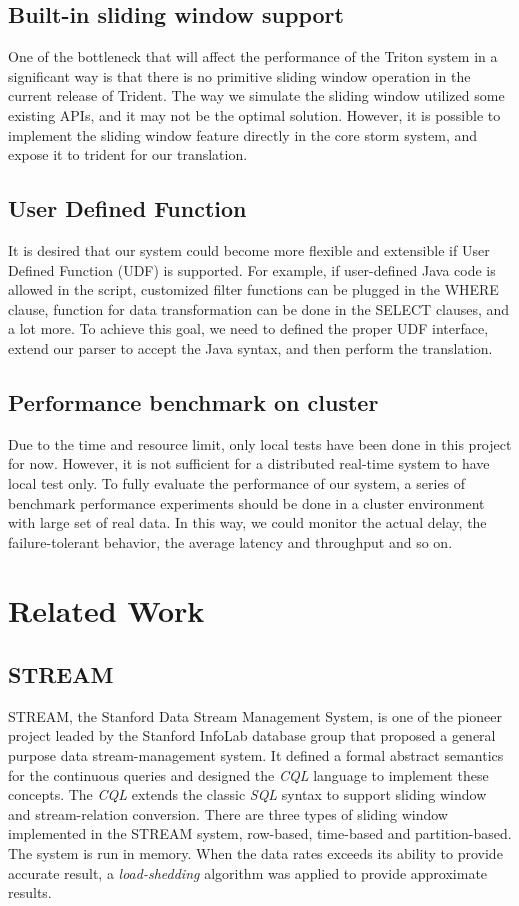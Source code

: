 \documentclass[conference, twocolumn, 11pt]{IEEEtran}
\theoremstyle{definition}
\begin{document}
\subsection{Built-in sliding window support}
One of the bottleneck that will affect the performance of the Triton system in a significant way is that there is no primitive sliding window operation in the current release of Trident.
The way we simulate the sliding window utilized some existing APIs, and it may not be the optimal solution. However, it is possible to implement the sliding window feature directly in
the core storm system, and expose it to trident for our translation.

\subsection{User Defined Function}
It is desired that our system could become more flexible and extensible if User Defined Function (UDF) is supported. For example, if user-defined Java code is allowed in the script,
customized filter functions can be plugged in the WHERE clause, function for data transformation can be done in the SELECT clauses, and a lot more.
To achieve this goal, we need to defined the proper UDF interface, extend our parser to accept the Java syntax, and then perform the translation.

\subsection{Performance benchmark on cluster}
Due to the time and resource limit, only local tests have been done in this project for now. However, it is not sufficient for a distributed real-time system to have local test only.
To fully evaluate the performance of our system, a series of benchmark performance experiments should be done in a cluster environment with large set of real data. In this way,
we could monitor the actual delay, the failure-tolerant behavior, the average latency and throughput and so on.


\section{Related Work}\label{rel-work}
\subsection{STREAM}
STREAM, the Stanford Data Stream Management System, is one of the pioneer project leaded by the Stanford InfoLab database group that proposed a general purpose data stream-management system.
It defined a formal abstract semantics for the continuous queries and designed the \emph{CQL} language to implement these concepts. The \emph{CQL} extends the classic \emph{SQL} syntax to
support sliding window and stream-relation conversion. There are three types of sliding window implemented in the STREAM system, row-based, time-based and partition-based. The system is run in
memory. When the data rates exceeds its ability to provide accurate result, a \emph{load-shedding} algorithm was applied to provide approximate results.
\end{document}
